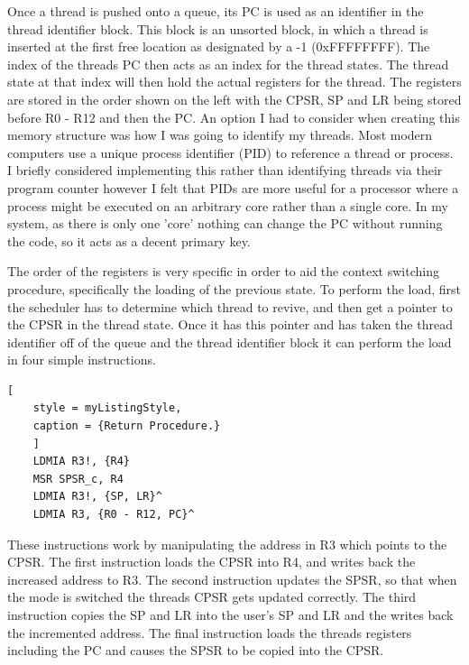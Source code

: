 Once a thread is pushed onto a queue, its PC is used as an identifier in the thread identifier block. This block is an unsorted block, in which a thread is inserted at the first free location as designated by a -1 (0xFFFFFFFF). The index of the threads PC then acts as an index for the thread states. The thread state at that index will then hold the actual registers for the thread. The registers are stored in the order shown on the left with the CPSR, SP and LR being stored before R0 - R12 and then the PC. An option I had to consider when creating this memory structure was how I was going to identify my threads. Most modern computers use a unique process identifier (PID) to reference a thread or process. %
I briefly considered implementing this rather than identifying threads via their program counter however I felt that PIDs are more useful for a processor where a process might be executed on an arbitrary core rather than a single core. In my system, as there is only one 'core' nothing can change the PC without running the code, so it acts as a decent primary key.

The order of the registers is very specific in order to aid the context switching procedure, specifically the loading of the previous state. To perform the load, first the scheduler has to determine which thread to revive, and then get a pointer to the CPSR in the thread state. Once it has this pointer and has taken the thread identifier off of the queue and the thread identifier block it can perform the load in four simple instructions.

\begin{lstlisting}[
	style = myListingStyle,
	caption = {Return Procedure.}
	]
	LDMIA R3!, {R4}
	MSR SPSR_c, R4
	LDMIA R3!, {SP, LR}^
	LDMIA R3, {R0 - R12, PC}^
\end{lstlisting}

These instructions work by manipulating the address in R3 which points to the CPSR. The first instruction loads the CPSR into R4, and writes back the increased address to R3. The second instruction updates the SPSR, so that when the mode is switched the threads CPSR gets updated correctly. The third instruction copies the SP and LR into the user's SP and LR and the writes back the incremented address. The final instruction loads the threads registers including the PC and causes the SPSR to be copied into the CPSR.

